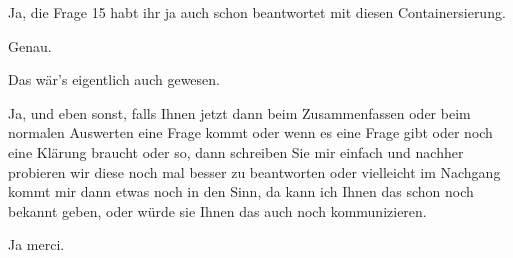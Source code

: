 \begin{description}
\DS Ja, die Frage 15 habt ihr ja auch schon beantwortet mit diesen Containersierung.

\NH Genau.

\DS Das wär's eigentlich auch gewesen.

\NH Ja, und eben sonst, falls Ihnen jetzt dann beim Zusammenfassen oder beim normalen Auswerten eine Frage kommt oder wenn es eine Frage gibt oder noch eine Klärung braucht oder so, dann schreiben Sie mir einfach und nachher probieren wir  diese noch mal besser zu beantworten oder vielleicht im Nachgang kommt mir dann etwas noch in den Sinn, da kann ich Ihnen das schon noch bekannt geben, oder würde sie Ihnen das auch noch kommunizieren.

\DS Ja merci.
	
\end{description}